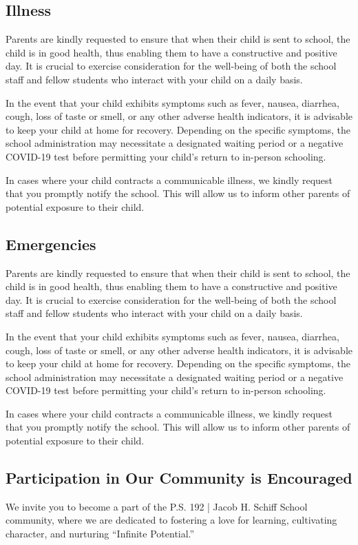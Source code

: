 \documentclass[letterpaper, 11pt]{article}
\begin{document}
\subsection{Illness}
\label{sec:org89af9c1}
Parents are kindly requested to ensure that when their child is sent to school, the child is in good health, thus enabling them to have a constructive and positive day. It is crucial to exercise consideration for the well-being of both the school staff and fellow students who interact with your child on a daily basis.

In the event that your child exhibits symptoms such as fever, nausea, diarrhea, cough, loss of taste or smell, or any other adverse health indicators, it is advisable to keep your child at home for recovery. Depending on the specific symptoms, the school administration may necessitate a designated waiting period or a negative COVID-19 test before permitting your child’s return to in-person schooling.

In cases where your child contracts a communicable illness, we kindly request that you promptly notify the school. This will allow us to inform other parents of potential exposure to their child.

\subsection{Emergencies}
\label{sec:orgabb01a6}
Parents are kindly requested to ensure that when their child is sent to school, the child is in good health, thus enabling them to have a constructive and positive day. It is crucial to exercise consideration for the well-being of both the school staff and fellow students who interact with your child on a daily basis.

In the event that your child exhibits symptoms such as fever, nausea, diarrhea, cough, loss of taste or smell, or any other adverse health indicators, it is advisable to keep your child at home for recovery. Depending on the specific symptoms, the school administration may necessitate a designated waiting period or a negative COVID-19 test before permitting your child’s return to in-person schooling.

In cases where your child contracts a communicable illness, we kindly request that you promptly notify the school. This will allow us to inform other parents of potential exposure to their child.

\subsection{Participation in Our Community is Encouraged}
\label{sec:org2678f51}
We invite you to become a part of the P.S. 192 | Jacob H. Schiff School community, where we are dedicated to fostering a love for learning, cultivating character, and nurturing ``Infinite Potential.''
\end{document}
